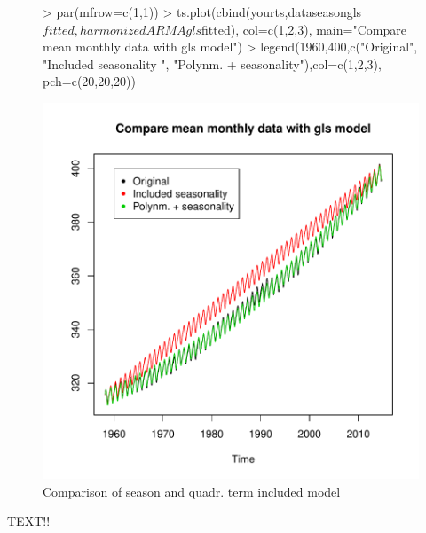 \documentclass[11pt, a4paper]{article} %
\begin{document}
\begin{figure}[H]
\centering
\begin{Schunk}
\begin{Sinput}
> par(mfrow=c(1,1))
> ts.plot(cbind(yourts,dataseasongls$fitted, harmonizedARMAgls$fitted), col=c(1,2,3),
         main="Compare mean monthly data with gls model")
> legend(1960,400,c("Original", "Included seasonality ",
                   "Polynm. + seasonality"),col=c(1,2,3), pch=c(20,20,20))
\end{Sinput}
\end{Schunk}
\includegraphics{alleselena-048}
\caption{Comparison of season and quadr. term included model}
\label{compq}
\end{figure}

\linebreak
TEXT!!
\end{document}
